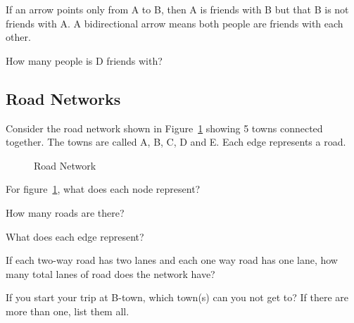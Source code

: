 \noindent
If an arrow points only from A to B, then A is friends with B but that B is not friends with A. A bidirectional arrow means both people are friends with each other.\par

\begin{alevel}
How many people is D friends with?
\end{alevel}

\subsection{Road Networks}
Consider the road network shown in Figure~\ref{F:1RN} showing 5 towns connected together. The towns are called A, B, C, D and E. Each edge represents a road.\par
\begin{figure}[H]
\begin{center}
\caption{Road Network}
\label{F:1RN}
\end{center}
\end{figure}

\begin{alevel}
For figure~\ref{F:1RN}, what does each node represent?
\end{alevel}

\begin{alevel}
How many roads are there?
\end{alevel}

\begin{alevel}
What does each edge represent?
\end{alevel}

\begin{alevel}
If each two-way road has two lanes and each one way road has one lane, how many total lanes of road does the network have?
\end{alevel}

\begin{alevel}
If you start your trip at B-town, which town(s) can you not get to? If there are more than one, list them all.
\end{alevel}

